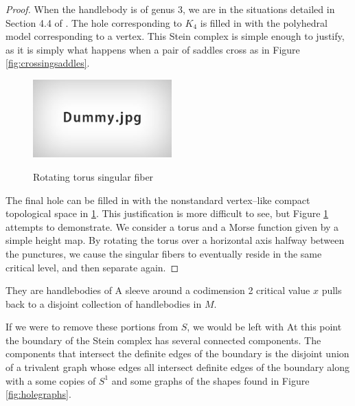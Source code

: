 \begin{proof}
													When the handlebody is of genus 3, we are in the situations detailed in Section 4.4 of \cite{CostThur08}.
													The hole corresponding to $K_4$ is filled in with the polyhedral model corresponding to a vertex.
													This Stein complex is simple enough to justify, as it is simply what happens when a pair of saddles cross as in Figure \ref{fig:crossingsaddles}.
													
													\begin{figure}
														\centering
														\captionsetup{justification=centering}
														\caption{Rotating torus singular fiber}
														\includegraphics[height=3cm]{figures/dummy.jpg}
														\label{fig:doublecone}
													\end{figure}
													
													The final hole can be filled in with the nonstandard vertex--like compact topological space in \ref{fig:doublecone}.
													This justification is more difficult to see, but Figure \ref{fig:doublecone} attempts to demonstrate.
													We consider a torus and a Morse function given by a simple height map.
													By rotating the torus over a horizontal axis halfway between the punctures, we cause the singular fibers to eventually reside in the same critical level, and then separate again.
													
													
													
													
													
													
													
													
													
													
													
													
\end{proof}
												
												
												
													
													They are handlebodies of 
													A sleeve around a codimension 2 critical value $x$ pulls back to a disjoint collection of handlebodies in $M$.
													
													If we were to remove these portions from $S$, we would be left with 
													At this point the boundary of the Stein complex has several connected components.
													The components that intersect the definite edges of the boundary 
													is the disjoint union of a trivalent graph whose edges all intersect definite edges of the boundary along with a some copies of $S^1$ and some graphs of the shapes found in Figure \ref{fig:holegraphs}.
												
